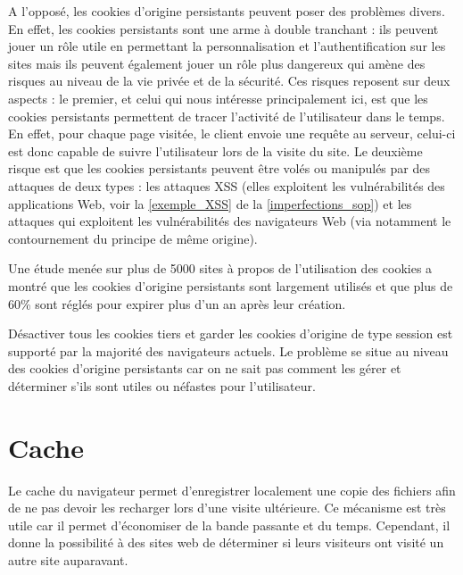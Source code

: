 A l'opposé, les cookies d'origine persistants peuvent poser des problèmes divers. En effet, les cookies persistants sont une arme à double tranchant : ils peuvent jouer un rôle utile en permettant la personnalisation et l'authentification sur les sites mais ils peuvent également jouer un rôle plus dangereux qui amène des risques au niveau de la vie privée et de la sécurité. Ces risques reposent sur deux aspects : le premier, et celui qui nous intéresse principalement ici, est que les cookies persistants permettent de tracer l'activité de l'utilisateur dans le temps. En effet, pour chaque page visitée, le client envoie une requête au serveur, celui-ci est donc capable de suivre l'utilisateur lors de la visite du site. Le deuxième risque est que les cookies persistants peuvent être volés ou manipulés par des attaques de deux types : les attaques XSS (elles exploitent les vulnérabilités des applications Web, voir la \autoref{exemple_XSS} de la \autoref{imperfections_sop}) et les attaques qui exploitent les vulnérabilités des navigateurs Web (via notamment le contournement du principe de même origine).
\newline

Une étude menée sur plus de 5000 sites à propos de l'utilisation des cookies \cite{Yue:2007:ACU:1251984.1253093} a montré que les cookies d'origine persistants sont largement utilisés et que plus de 60\% sont réglés pour expirer plus d'un an après leur création.
\newline

Désactiver tous les cookies tiers et garder les cookies d'origine de type session est supporté par la majorité des navigateurs actuels. Le problème se situe au niveau des cookies d'origine persistants car on ne sait pas comment les gérer et déterminer s'ils sont utiles ou néfastes pour l'utilisateur.


\section{Cache}
\label{cache}
Le cache du navigateur permet d'enregistrer localement une copie des fichiers afin de ne pas devoir les recharger lors d'une visite ultérieure. Ce mécanisme est très utile car il permet d'économiser de la bande passante et du temps. Cependant, il donne la possibilité à des sites web de déterminer si leurs visiteurs ont visité un autre site auparavant.

